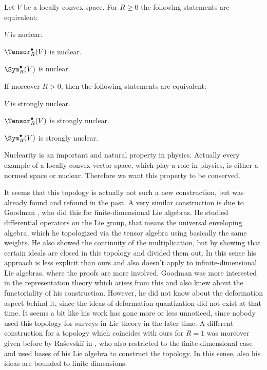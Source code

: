 \begin{proposition}[Nuclearity]
	\label{LCAna:Nuclearity}
	Let $V$ be a locally convex space. For $R \geq 0$ the following statements 
	are equivalent:
	\begin{propositionlist}
	  \item
		$V$ is nuclear.
	  \item
	  	$\Tensor_R^{\bullet}(V)$ is nuclear.
	  \item
	  	$\Sym_R^{\bullet}(V)$ is nuclear.	  	
	\end{propositionlist}
	If moreover $R > 0$, then the following statements are equivalent:
	\begin{propositionlist}
	  \item
		$V$ is strongly nuclear.
	  \item
	  	$\Tensor_R^{\bullet}(V)$ is strongly nuclear.
	  \item
	  	$\Sym_R^{\bullet}(V)$ is strongly nuclear.
	\end{propositionlist}
\end{proposition}
Nuclearity is an important and natural property in physics. Actually every 
example of a locally convex vector space, which play a role in physics, is 
either a normed space or nuclear. Therefore we want this property to be 
conserved.
\begin{remark}
	It seems that this topology is actually not such a new construction, but 
	was already found and refound in the past. A very similar construction is 
	due to Goodman \cite{goodman:1971a}, who did this for finite-dimensional 
	Lie algebras. He studied differential operators on the Lie group, that 
	means the universal enveloping algebra, which he topologized via the 
	tensor algebra using basically the same weights. He also showed the 
	continuity of the multiplication, but by showing that certain ideals are 
	closed in this topology and divided them out. In this sense his approach 
	is less explicit than ours and also doesn't apply to infinite-dimensional 
	Lie algebras, where the proofs are more involved. Goodman was more 
	interested in the representation theory which arises from this and also 
	knew about the functoriality of his construction. However, he did not know 
	about the deformation aspect behind it, since the ideas of deformation 
	quantization did not exist at that time. It seems a bit like his work has 
	gone more or less unnoticed, since nobody used this topology for surveys 
	in Lie theory in the later time. A different construction for a topology 
	which coincides with ours for $R = 1$ was moreover given before by 
	Ra{\v{s}}evski{\u{i}} in \cite{rasevskii:1966a}, who also restricted to 
	the	finite-dimensional case and used bases of his Lie algebra to construct 
	the 	topology. In this sense, also his ideas are bounded to finite 
	dimensions.
\end{remark}



